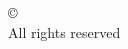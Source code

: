 \thispagestyle{empty}
\begin{center}
\vspace*{\fill}
{\copyright~ \textit{\firstAuthor}}\\
All rights reserved
\vspace*{\fill} 
\end{center}